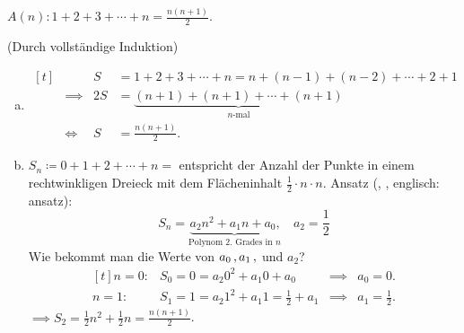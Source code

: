 \documentclass[../ana1.tex]{subfiles}
\begin{document}
\begin{bsp}
	\(A(n): 1+2+3+\cdots+n = \frac{n(n+1)}{2}\).
	\begin{bew} (Durch vollständige Induktion)
	\end{bew}
\end{bsp}
\begin{bem}\label{satz:summenformel}\leavevmode
	\begin{enumerate}[(a)]
		\item \(\begin{aligned}[t]
					&	         		 & S &= 1 + 2 + 3 + \cdots + n = n + (n-1)+ (n-2) + \cdots + 2 + 1\\
					&\implies 		     &2S &= \underbrace{(n+1)+(n+1)+\cdots+(n+1)}_{n\text{-mal}}\\
					&\Longleftrightarrow & S &= \frac{n(n+1)}{2}.
			    \end{aligned}\)
		\item \( S_{n} \coloneqq 0 + 1 + 2 + \cdots + n = \) entspricht der Anzahl der Punkte in einem 
			  rechtwinkligen Dreieck mit dem Flächeninhalt \(\frac{1}{2}\cdot n \cdot n\).\newline
			  Ansatz (, , englisch: ansatz):
			  \[S_{n} = \underbrace{a_{2}n^{2} + a_{1}n + a_{0}\text{,}}_{\text{Polynom }2\text{. Grades in }n}\quad a_{2} = \frac{1}{2}\]
			  Wie bekommt man die Werte von \(a_0 \operatorname{,} a_1 \operatorname{,}\) und \(a_2\)?
			  \[\begin{aligned}[t]
					n=0\colon& S_{0} = 0 = a_{2}0^{2} + a_{1}0 + a_{0}               &\implies& a_{0} = 0.\\ 
					n=1\colon& S_{1} = 1 = a_{2}1^{2} + a_{1}1 = \frac{1}{2} + a_{1} &\implies& a_{1} = \frac{1}{2}.
			    \end{aligned}\]
			  \(\implies S_{2} = \frac{1}{2}n^{2} + \frac{1}{2}n = \frac{n(n+1)}{2}\).
	\end{enumerate}
\end{bem}

\iftoggle{short}{}{\newpage}%
\end{document}
